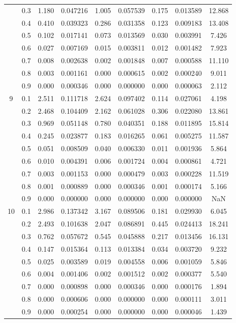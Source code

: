 \begin{longtable}{ | c | c || c | c | c | c | c | c | c | }
 & 0.3 & 1.180 & 0.047216 & 1.005 & 0.057539 & 0.175 & 0.013589 & 12.868 \\
 & 0.4 & 0.410 & 0.039323 & 0.286 & 0.031358 & 0.123 & 0.009183 & 13.408 \\
 & 0.5 & 0.102 & 0.017141 & 0.073 & 0.013569 & 0.030 & 0.003991 & 7.426 \\
 & 0.6 & 0.027 & 0.007169 & 0.015 & 0.003811 & 0.012 & 0.001482 & 7.923 \\
 & 0.7 & 0.008 & 0.002638 & 0.002 & 0.001848 & 0.007 & 0.000588 & 11.110 \\
 & 0.8 & 0.003 & 0.001161 & 0.000 & 0.000615 & 0.002 & 0.000240 & 9.011 \\
 & 0.9 & 0.000 & 0.000346 & 0.000 & 0.000000 & 0.000 & 0.000063 & 2.112 \\
 \hline
\multirow{9}{*}{9} & 0.1 & 2.511 & 0.111718 & 2.624 & 0.097402 & 0.114 & 0.027061 & 4.198 \\
 & 0.2 & 2.468 & 0.104409 & 2.162 & 0.061028 & 0.306 & 0.022080 & 13.861 \\
 & 0.3 & 0.969 & 0.051148 & 0.780 & 0.040351 & 0.188 & 0.011895 & 15.814 \\
 & 0.4 & 0.245 & 0.023877 & 0.183 & 0.016265 & 0.061 & 0.005275 & 11.587 \\
 & 0.5 & 0.051 & 0.008509 & 0.040 & 0.006330 & 0.011 & 0.001936 & 5.864 \\
 & 0.6 & 0.010 & 0.004391 & 0.006 & 0.001724 & 0.004 & 0.000861 & 4.721 \\
 & 0.7 & 0.003 & 0.001153 & 0.000 & 0.000479 & 0.003 & 0.000228 & 11.519 \\
 & 0.8 & 0.001 & 0.000889 & 0.000 & 0.000346 & 0.001 & 0.000174 & 5.166 \\
 & 0.9 & 0.000 & 0.000000 & 0.000 & 0.000000 & 0.000 & 0.000000 & NaN \\
 \hline
\multirow{9}{*}{10} & 0.1 & 2.986 & 0.137342 & 3.167 & 0.089506 & 0.181 & 0.029930 & 6.045 \\
 & 0.2 & 2.493 & 0.101638 & 2.047 & 0.086891 & 0.445 & 0.024413 & 18.241 \\
 & 0.3 & 0.762 & 0.057672 & 0.545 & 0.045888 & 0.217 & 0.013456 & 16.131 \\
 & 0.4 & 0.147 & 0.015364 & 0.113 & 0.013384 & 0.034 & 0.003720 & 9.232 \\
 & 0.5 & 0.025 & 0.003589 & 0.019 & 0.004558 & 0.006 & 0.001059 & 5.846 \\
 & 0.6 & 0.004 & 0.001406 & 0.002 & 0.001512 & 0.002 & 0.000377 & 5.540 \\
 & 0.7 & 0.000 & 0.000898 & 0.000 & 0.000346 & 0.000 & 0.000176 & 1.894 \\
 & 0.8 & 0.000 & 0.000606 & 0.000 & 0.000000 & 0.000 & 0.000111 & 3.011 \\
 & 0.9 & 0.000 & 0.000254 & 0.000 & 0.000000 & 0.000 & 0.000046 & 1.439 \\
 \hline
\hline
\end{longtable}
 
